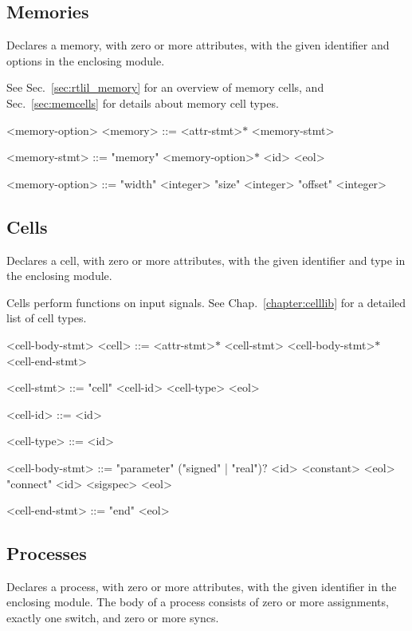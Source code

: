 \subsection{Memories}

Declares a memory, with zero or more attributes, with the given identifier and options in the enclosing module.

See Sec.~\ref{sec:rtlil_memory} for an overview of memory cells, and Sec.~\ref{sec:memcells} for details about memory cell types.

\begin{indentgrammar}{<memory-option>}
<memory> ::= <attr-stmt>$*$ <memory-stmt>

<memory-stmt> ::= "memory" <memory-option>$*$ <id> <eol>

<memory-option> ::= 
"width" <integer>
  \alt "size" <integer>
  \alt "offset" <integer>
\end{indentgrammar}

\subsection{Cells}

Declares a cell, with zero or more attributes, with the given identifier and type in the enclosing module. 

Cells perform functions on input signals. See Chap.~\ref{chapter:celllib} for a detailed list of cell types.

\begin{indentgrammar}{<cell-body-stmt>}
<cell> ::= <attr-stmt>$*$ <cell-stmt> <cell-body-stmt>$*$ <cell-end-stmt>

<cell-stmt> ::= "cell" <cell-id> <cell-type> <eol>

<cell-id> ::= <id>

<cell-type> ::= <id>

<cell-body-stmt> ::= 
"parameter" ("signed" | "real")$?$ <id> <constant> <eol>
  \alt "connect" <id> <sigspec> <eol>

<cell-end-stmt> ::= "end" <eol>
\end{indentgrammar}

\subsection{Processes}

Declares a process, with zero or more attributes, with the given identifier in the enclosing module. The body of a process consists of zero or more assignments, exactly one switch, and zero or more syncs.

